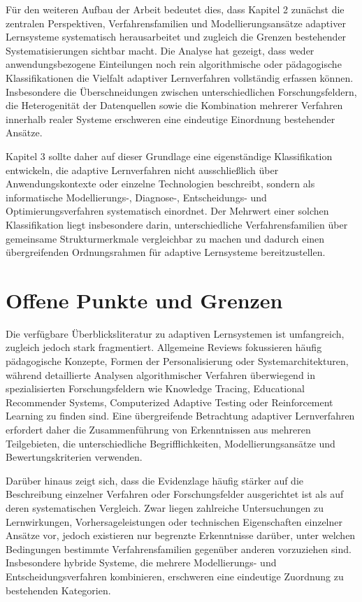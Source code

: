 Für den weiteren Aufbau der Arbeit bedeutet dies, dass Kapitel 2
zunächst die zentralen Perspektiven, Verfahrensfamilien und
Modellierungsansätze adaptiver Lernsysteme systematisch herausarbeitet
und zugleich die Grenzen bestehender Systematisierungen sichtbar macht.
Die Analyse hat gezeigt, dass weder anwendungsbezogene Einteilungen noch
rein algorithmische oder pädagogische Klassifikationen die Vielfalt
adaptiver Lernverfahren vollständig erfassen können. Insbesondere die
Überschneidungen zwischen unterschiedlichen Forschungsfeldern, die
Heterogenität der Datenquellen sowie die Kombination mehrerer Verfahren
innerhalb realer Systeme erschweren eine eindeutige Einordnung
bestehender Ansätze.

Kapitel 3 sollte daher auf dieser Grundlage eine eigenständige
Klassifikation entwickeln, die adaptive Lernverfahren nicht
ausschließlich über Anwendungskontexte oder einzelne Technologien
beschreibt, sondern als informatische Modellierungs-, Diagnose-,
Entscheidungs- und Optimierungsverfahren systematisch einordnet. Der
Mehrwert einer solchen Klassifikation liegt insbesondere darin,
unterschiedliche Verfahrensfamilien über gemeinsame Strukturmerkmale
vergleichbar zu machen und dadurch einen übergreifenden Ordnungsrahmen
für adaptive Lernsysteme bereitzustellen.

\section{Offene Punkte und Grenzen}\label{offene-punkte-und-grenzen}

Die verfügbare Überblicksliteratur zu adaptiven Lernsystemen ist
umfangreich, zugleich jedoch stark fragmentiert. Allgemeine Reviews
fokussieren häufig pädagogische Konzepte, Formen der Personalisierung
oder Systemarchitekturen, während detaillierte Analysen algorithmischer
Verfahren überwiegend in spezialisierten Forschungsfeldern wie Knowledge
Tracing, Educational Recommender Systems, Computerized Adaptive Testing
oder Reinforcement Learning zu finden sind. Eine übergreifende
Betrachtung adaptiver Lernverfahren erfordert daher die Zusammenführung
von Erkenntnissen aus mehreren Teilgebieten, die unterschiedliche
Begrifflichkeiten, Modellierungsansätze und Bewertungskriterien
verwenden.

Darüber hinaus zeigt sich, dass die Evidenzlage häufig stärker auf die
Beschreibung einzelner Verfahren oder Forschungsfelder ausgerichtet ist
als auf deren systematischen Vergleich. Zwar liegen zahlreiche
Untersuchungen zu Lernwirkungen, Vorhersageleistungen oder technischen
Eigenschaften einzelner Ansätze vor, jedoch existieren nur begrenzte
Erkenntnisse darüber, unter welchen Bedingungen bestimmte
Verfahrensfamilien gegenüber anderen vorzuziehen sind. Insbesondere
hybride Systeme, die mehrere Modellierungs- und Entscheidungsverfahren
kombinieren, erschweren eine eindeutige Zuordnung zu bestehenden
Kategorien.

